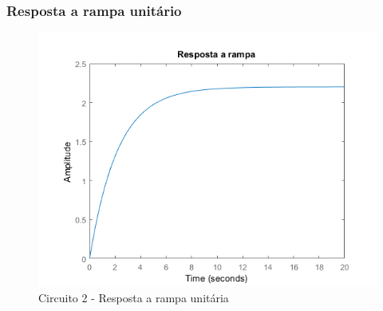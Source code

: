 \documentclass[a4paper, 12pt]{article}
\begin{document}
			\subsubsection{Resposta a rampa unitário}
			\begin{figure}[!ht]
				\centering
				\includegraphics[scale=0.72]{img/1h_circ2.png}
				\caption{Circuito 2 - Resposta a rampa unitária}	
			\end{figure}		
			
\end{document}
